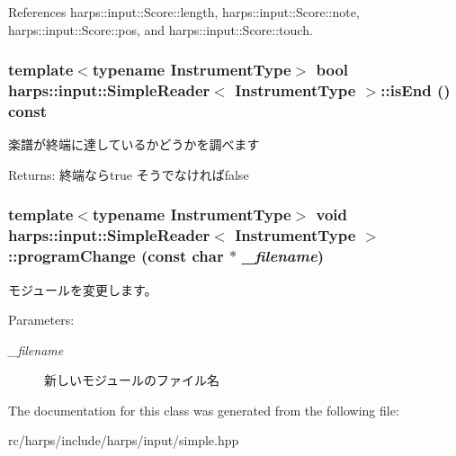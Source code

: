 References harps::input::Score::length, harps::input::Score::note, harps::input::Score::pos, and harps::input::Score::touch.
\subsubsection[isEnd]{\setlength{\rightskip}{0pt plus 5cm}template$<$typename InstrumentType$>$ bool {\bf harps::input::SimpleReader}$<$ InstrumentType $>$::isEnd () const\hspace{0.3cm}{\tt  [inline]}}\label{classharps_1_1input_1_1SimpleReader_9a4e0775e2fdc12d8ff97352d7e83cce}


楽譜が終端に達しているかどうかを調べます \begin{Desc}
\item[Returns:]終端ならtrue そうでなければfalse \end{Desc}
\subsubsection[programChange]{\setlength{\rightskip}{0pt plus 5cm}template$<$typename InstrumentType$>$ void {\bf harps::input::SimpleReader}$<$ InstrumentType $>$::programChange (const char $\ast$ {\em \_\-filename})\hspace{0.3cm}{\tt  [inline]}}\label{classharps_1_1input_1_1SimpleReader_6223220966d8abe9ecca4a104a02b9a6}


モジュールを変更します。 \begin{Desc}
\item[Parameters:]
\begin{description}
\item[{\em \_\-filename}]新しいモジュールのファイル名 \end{description}
\end{Desc}


The documentation for this class was generated from the following file:\begin{CompactItemize}
\item 
rc/harps/include/harps/input/simple.hpp\end{CompactItemize}
